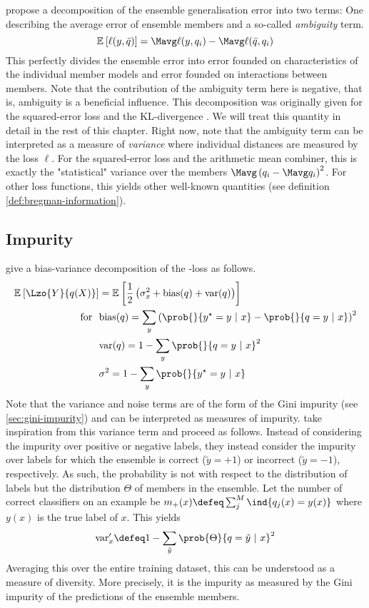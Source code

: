 \documentclass[../main.tex]{subfiles}
\begin{document}
\cite{krogh1995} propose a decomposition of the ensemble generalisation error into two terms: One describing the average error of ensemble members and a so-called \textit{ambiguity} term. 
$$
\mathbb{E}_{}\left[ \ell(y, \bar{q}) \right] = \Mavg \ell(y, q_{i}) - \Mavg \ell(\bar{q}, q_{i})
$$
This perfectly divides the ensemble error into error founded on characteristics of the individual member models and error founded on interactions between members. Note that the contribution of the ambiguity term here is negative, that is, ambiguity is a beneficial influence. 
This decomposition was originally given for the squared-error loss \cite{krogh_NeuralNetworkEnsembles_1995} and the KL-divergence \cite{todo}. We will treat this quantity in detail in the rest of this chapter. Right now, note that the ambiguity term can be interpreted as a measure of \textit{variance} where individual distances are measured by the loss $\ell$. For the squared-error loss and the arithmetic mean combiner, this is exactly the "statistical" variance over the members $\Mavg \left(q_{i} - \Mavg q_{i}\right)^2$. For other loss functions, this yields other well-known quantities (see definition \ref{def:bregman-information}).

\subsection{Impurity} 
\citeauthor{KohaviWolpert} give a bias-variance decomposition of the \zeroone-loss as follows.
$$
\begin{align}
\mathbb{E}_{}\left[ \Lzo{Y}{q(X)} \right] &= 
\mathbb{E}_{}\left[  
\frac{1}{2}\left( \sigma^2_{x} + \text{bias}(q) + \text{var}(q)   \right)
\right] \\
\text{for} ~ ~ & \text{bias}(q) =  \sum_{y} \left(  \prob{}{y^\star = y ~|~x} - \prob{}{q=y ~|~ x} \right)^2 \\
& \text{var}(q) = 1 - \sum_{y} \prob{}{q=y ~|~x}^2  \\
& \sigma^2 = 1 - \sum_{y} \prob{}{y^\star = y ~|~ x}
\end{align}
$$
Note that the variance and noise terms are of the form of the Gini impurity (see \ref{sec:gini-impurity}) and can be interpreted as measures of impurity.
\citeauthor{kunchevaWhittaker} take inspiration from this variance term and proceed as follows. Instead of considering the impurity over positive or negative labels, they instead consider the impurity over labels for which the ensemble is correct ($\tilde{y} = +1$) or incorrect ($\tilde{y} = -1$), respectively. As such, the probability is not with respect to the distribution of labels but the distribution $\Theta$ of members in the ensemble. Let the number of correct classifiers on an example be $m_{+}(x) \defeq \sum_{j}^M \ind{q_{j}(x) = y(x)}$ where $y(x)$ is the true label of $x$. This yields
$$
\text{var}'_{x} \defeq 1 - \sum_{\tilde{y}} \prob{\Theta}{q = \tilde{y} ~ |~ x}^2
$$
Averaging this over the entire training dataset, this can be understood as a measure of diversity. More precisely, it is the impurity as measured by the Gini impurity of the predictions of the ensemble members.
\end{document}
